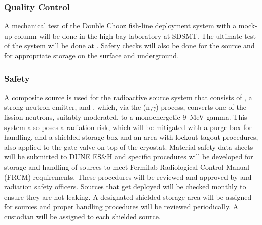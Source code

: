\subsubsection{Quality Control}
A mechanical test of the Double Chooz fish-line deployment system with a  mock-up column will be done in the high bay laboratory at SDSMT. The ultimate test of the system will be done at . Safety checks will also be done for the source and for appropriate storage on the surface and underground. 

\subsubsection{Safety}
\label{sec:sp-calib-rsds-safety}
A composite source is used for the radioactive source system that consists  of , a strong neutron emitter, and , which, via the (n,$\gamma$) process, converts one of the  fission neutrons, suitably moderated, to a monoenergetic \SI{9}{\MeV} gamma. This system also poses a radiation risk, which will be mitigated with a purge-box for handling, and a shielded storage box and an area with lockout-tagout procedures, also applied to the gate-valve on top of the cryostat. Material safety data sheets will be submitted to DUNE ES\&H and specific procedures will be developed for storage and handling of sources to meet Fermilab Radiological Control Manual (FRCM) requirements. These procedures will be reviewed and approved by  and \fnal radiation safety officers. Sources that get deployed will be checked monthly to ensure they are not leaking. A designated shielded storage area will be assigned for sources and proper handling procedures will be reviewed periodically. A custodian will be assigned to each shielded source.